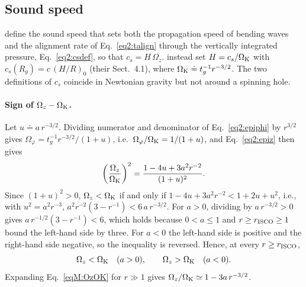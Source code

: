 \subsection{Sound speed}
\label{appM:cs}

\citet{FoucartLai2014} define the sound speed that sets both the propagation speed of bending waves and the alignment rate of Eq.~\eqref{eq2:talign} through the vertically integrated pressure, Eq.~\eqref{eq2:csdef}, so that $c_s=H\,\Omega_z$.
\citet{Motta2017} instead set $H=c_s/\Omega_\textup{K}$ with $c_s(R_g)=c\,(H/R)_0$ (their Sect.~4.1), where $\Omega_\textup{K}\doteq t_g^{-1}r^{-3/2}$.
The two definitions of $c_s$ coincide in Newtonian gravity but not around a spinning hole.

\paragraph{Sign of $\Omega_z-\Omega_\textup{K}$.}
Let $u\doteq a\,r^{-3/2}$.
Dividing numerator and denominator of Eq.~\eqref{eq2:epiphi} by $r^{3/2}$ gives $\Omega_\varphi=t_g^{-1}r^{-3/2}/(1+u)$, i.e.\ $\Omega_\varphi/\Omega_\textup{K}=1/(1+u)$, and Eq.~\eqref{eq2:epiz} then gives
\begin{equation}
    \label{eqM:OzOK}
    \left(\frac{\Omega_z}{\Omega_\textup{K}}\right)^2=\frac{1-4u+3a^2r^{-2}}{(1+u)^2}.
\end{equation}
Since $(1+u)^2>0$, $\Omega_z<\Omega_\textup{K}$ if and only if $1-4u+3a^2r^{-2}<1+2u+u^2$, i.e., with $u^2=a^2r^{-3}$, $a^2r^{-2}\left(3-r^{-1}\right)<6\,a\,r^{-3/2}$.
For $a>0$, dividing by $a\,r^{-3/2}>0$ gives $a\,r^{-1/2}(3-r^{-1})<6$, which holds because $0<a\leq1$ and $r\geq r_\textup{ISCO}\geq1$ bound the left-hand side by three.
For $a<0$ the left-hand side is positive and the right-hand side negative, so the inequality is reversed.
Hence, at every $r\geq r_\textup{ISCO}$,
\begin{equation}
    \label{eqM:OzOKsign}
    \Omega_z<\Omega_\textup{K}\quad(a>0),
    \qquad
    \Omega_z>\Omega_\textup{K}\quad(a<0).
\end{equation}
Expanding Eq.~\eqref{eqM:OzOK} for $r\gg1$ gives $\Omega_z/\Omega_\textup{K}\simeq1-3a\,r^{-3/2}$.

